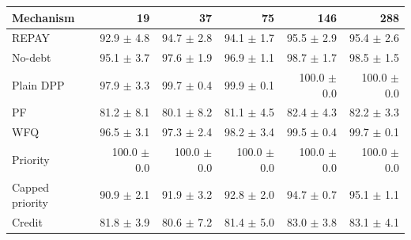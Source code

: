 \begin{tabular}{lrrrrr}
\toprule
Mechanism & 19 & 37 & 75 & 146 & 288 \\
\midrule
REPAY & 92.9 $\pm$ 4.8 & 94.7 $\pm$ 2.8 & 94.1 $\pm$ 1.7 & 95.5 $\pm$ 2.9 & 95.4 $\pm$ 2.6 \\
No-debt & 95.1 $\pm$ 3.7 & 97.6 $\pm$ 1.9 & 96.9 $\pm$ 1.1 & 98.7 $\pm$ 1.7 & 98.5 $\pm$ 1.5 \\
Plain DPP & 97.9 $\pm$ 3.3 & 99.7 $\pm$ 0.4 & 99.9 $\pm$ 0.1 & 100.0 $\pm$ 0.0 & 100.0 $\pm$ 0.0 \\
PF & 81.2 $\pm$ 8.1 & 80.1 $\pm$ 8.2 & 81.1 $\pm$ 4.5 & 82.4 $\pm$ 4.3 & 82.2 $\pm$ 3.3 \\
WFQ & 96.5 $\pm$ 3.1 & 97.3 $\pm$ 2.4 & 98.2 $\pm$ 3.4 & 99.5 $\pm$ 0.4 & 99.7 $\pm$ 0.1 \\
Priority & 100.0 $\pm$ 0.0 & 100.0 $\pm$ 0.0 & 100.0 $\pm$ 0.0 & 100.0 $\pm$ 0.0 & 100.0 $\pm$ 0.0 \\
Capped priority & 90.9 $\pm$ 2.1 & 91.9 $\pm$ 3.2 & 92.8 $\pm$ 2.0 & 94.7 $\pm$ 0.7 & 95.1 $\pm$ 1.1 \\
Credit & 81.8 $\pm$ 3.9 & 80.6 $\pm$ 7.2 & 81.4 $\pm$ 5.0 & 83.0 $\pm$ 3.8 & 83.1 $\pm$ 4.1 \\
\bottomrule
\end{tabular}
